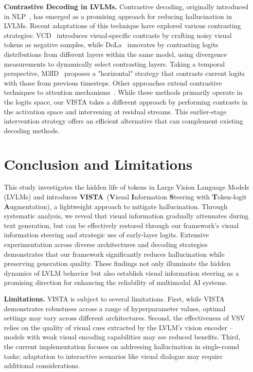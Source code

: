 \documentclass{article}
\newcommand{\ours}{{VISTA}\xspace}
\theoremstyle{plain}
\theoremstyle{definition}
\theoremstyle{remark}
\begin{document}
\textbf{Contrastive Decoding in LVLMs.} 
Contrastive decoding, originally introduced in NLP~\cite{li2022contrastive, shi2023trusting}, has emerged as a promising approach for reducing hallucination in LVLMs. Recent adaptations of this technique have explored various contrasting strategies: VCD~\cite{vcd} introduces visual-specific contrasts by crafting noisy visual tokens as negative samples, while DoLa~\cite{dola} innovates by contrasting logits distributions from different layers within the same model, using divergence measurements to dynamically select contrasting layers. Taking a temporal perspective, M3ID~\cite{favero2024multi} proposes a "horizontal" strategy that contrasts current logits with those from previous timesteps. Other approaches extend contrastive techniques to attention mechanisms~\cite{woo2024don}. While these methods primarily operate in the logits space, our \ours takes a different approach by performing contrasts in the activation space and intervening at residual streams. This earlier-stage intervention strategy offers an efficient alternative that can complement existing decoding methods.

\section{Conclusion and Limitations}\label{sec:conclusion}
This study investigates the hidden life of tokens in Large Vision Language Models (LVLMs) and introduces \textbf{\ours}~(\textbf{V}isual \textbf{I}nformation \textbf{S}teering with \textbf{T}oken-logit \textbf{A}ugmentation), a lightweight approach to mitigate hallucination.
Through systematic analysis, we reveal that visual information gradually attenuates during text generation, but can be effectively restored through our framework's visual information steering and strategic use of early-layer logits. Extensive experimentation across diverse architectures and decoding strategies demonstrates that our framework significantly reduces hallucination while preserving generation quality.
These findings not only illuminate the hidden dynamics of LVLM behavior but also establish visual information steering as a promising direction for enhancing the reliability of multimodal AI systems.

\textbf{Limitations.} VISTA is subject to several limitations. First, while VISTA demonstrates robustness across a range of hyperparameter values, optimal settings may vary across different architectures. Second, the effectiveness of VSV relies on the quality of visual cues extracted by the LVLM's vision encoder -- models with weak visual encoding capabilities may see reduced benefits. Third, the current implementation focuses on addressing hallucination in single-round tasks; adaptation to interactive scenarios like visual dialogue may require additional considerations.
\end{document}
